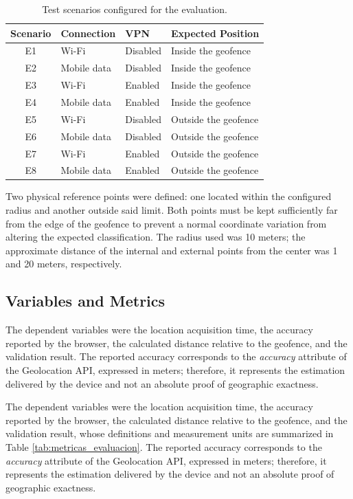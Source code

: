 \documentclass[runningheads]{llncs}
\begin{document}
\begin{table}[htbp]
\centering
\caption{Test scenarios configured for the evaluation.}
\label{tab:escenarios_prueba}
\renewcommand{\arraystretch}{1.2} 
\begin{tabular}{@{}clll@{}}
\toprule
\textbf{Scenario} & \textbf{Connection} & \textbf{VPN} & \textbf{Expected Position} \\
\midrule
E1 & Wi-Fi & Disabled & Inside the geofence \\
E2 & Mobile data & Disabled & Inside the geofence \\
E3 & Wi-Fi & Enabled    & Inside the geofence \\
E4 & Mobile data & Enabled    & Inside the geofence \\
E5 & Wi-Fi & Disabled & Outside the geofence \\
E6 & Mobile data & Disabled & Outside the geofence \\
E7 & Wi-Fi & Enabled    & Outside the geofence \\
E8 & Mobile data & Enabled    & Outside the geofence \\
\bottomrule
\end{tabular}
\end{table}

Two physical reference points were defined: one located within the configured radius and another outside said limit. Both points must be kept sufficiently far from the edge of the geofence to prevent a normal coordinate variation from altering the expected classification. The radius used was 10 meters; the approximate distance of the internal and external points from the center was 1 and 20 meters, respectively.

\subsection{Variables and Metrics}
The dependent variables were the location acquisition time, the accuracy reported by the browser, the calculated distance relative to the geofence, and the validation result. The reported accuracy corresponds to the \textit{accuracy} attribute of the Geolocation API, expressed in meters; therefore, it represents the estimation delivered by the device and not an absolute proof of geographic exactness.

The dependent variables were the location acquisition time, the accuracy reported by the browser, the calculated distance relative to the geofence, and the validation result, whose definitions and measurement units are summarized in Table \ref{tab:metricas_evaluacion}. The reported accuracy corresponds to the \textit{accuracy} attribute of the Geolocation API, expressed in meters; therefore, it represents the estimation delivered by the device and not an absolute proof of geographic exactness.
\end{document}

